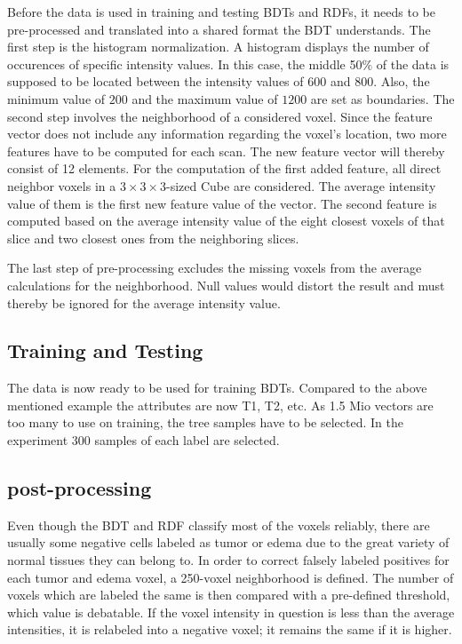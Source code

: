 \documentclass[
12pt,
headsepline,
bibliography=totoc,
twoside=semi,
]{scrartcl}
\begin{document}
 Before the data is used in training and testing BDTs and RDFs, it needs to be pre-processed and translated into a shared format the BDT understands. The first step is the histogram normalization. A histogram displays the number of occurences of specific intensity values. In this case, the middle 50$\%$ of the data is supposed to be located between the intensity values of $600$ and $800$. Also, the minimum value of $200$ and the maximum value of $1200$ are set as boundaries. The second step involves the neighborhood of a considered voxel. Since the feature vector does not include any information regarding the voxel's location, two more features have to be computed for each scan. The new feature vector will thereby consist of 12 elements. For the computation of the first added feature, all direct neighbor voxels in a $3 \times 3 \times 3$-sized Cube are considered. The average intensity value of them is the first new feature value of the vector. The second feature is computed based on the average intensity value of the eight closest voxels of that slice and two closest ones from the neighboring slices. 




 The last step of pre-processing excludes the missing voxels from the average calculations for the neighborhood. Null values would distort the result and must thereby be ignored for the average intensity value. 

 \subsection{Training and Testing\label{sec:sec3-3}}
 The data is now ready to be used for training BDTs. Compared to the above mentioned example the attributes are now T1, T2, etc. As 1.5 Mio vectors are too many to use on training, the tree samples have to be selected. In the experiment 300 samples of each label are selected.
 
 \subsection{post-processing\label{sec:sec3-4}}
 Even though the BDT and RDF classify most of the voxels reliably, there are usually some negative cells labeled as tumor or edema due to the great variety of normal tissues they can belong to. In order to correct falsely labeled positives for each tumor and edema voxel, a 250-voxel neighborhood is defined. The number of voxels which are labeled the same is then compared with a pre-defined threshold, which value is debatable. If the voxel intensity in question is less than the average intensities, it is relabeled into a negative voxel; it remains the same if it is higher.
\end{document}
